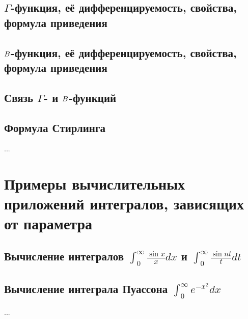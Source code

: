 \subsection{$\Gamma$-функция, её дифференцируемость, свойства, формула приведения}
\subsection{$B$-функция, её дифференцируемость, свойства, формула приведения}
\subsection{Связь $\Gamma$- и $B$-функций}
\subsection{Формула Стирлинга}
...

\section{Примеры вычислительных приложений интегралов, зависящих от параметра}
\subsection{Вычисление интегралов $\int_0^\infty \frac{\sin x}{x} dx$ и $\int_0^\infty \frac{\sin nt}{t} dt$}
\subsection{Вычисление интеграла Пуассона $\int_0^\infty e^{-x^2} dx$}
...
